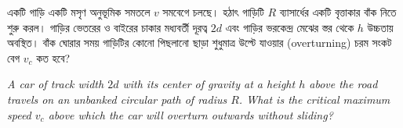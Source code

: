 \documentclass[12pt, a4paper]{article}
\begin{document}
\newpage
\begin{tcolorbox}[questionbox={প্রশ্ন (Question) 16}]
    \noindent
    একটি গাড়ি একটি মসৃণ অনুভূমিক সমতলে $v$ সমবেগে চলছে। হঠাৎ গাড়িটি $R$ ব্যাসার্ধের একটি বৃত্তাকার বাঁক নিতে শুরু করল। গাড়ির ভেতরের ও বাইরের চাকার মধ্যবর্তী দূরত্ব $2d$ এবং গাড়ির ভরকেন্দ্র মেঝের স্তর থেকে $h$ উচ্চতায় অবস্থিত। বাঁক ঘোরার সময় গাড়িটির কোনো পিছলানো ছাড়া শুধুমাত্র উল্টে যাওয়ার (overturning) চরম সংকট বেগ $v_c$ কত হবে?
    
    \vspace{0.8em}
    \begin{english}
    \noindent\textit{\color{darkgray}
    A car of track width $2d$ with its center of gravity at a height $h$ above the road travels on an unbanked circular path of radius $R$. What is the critical maximum speed $v_c$ above which the car will overturn outwards without sliding?
    }
    \end{english}
\end{tcolorbox}
\end{document}
